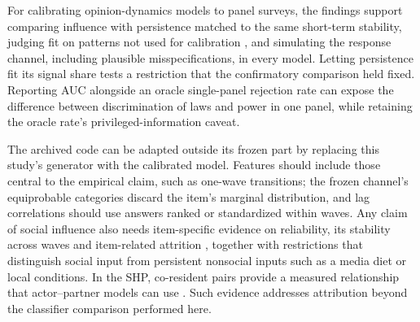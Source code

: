For calibrating opinion-dynamics models to panel surveys, the findings support comparing influence with persistence matched to the same short-term stability, judging fit on patterns not used for calibration \cite{grimm2005}, and simulating the response channel, including plausible misspecifications, in every model. Letting persistence fit its signal share tests a restriction that the confirmatory comparison held fixed. Reporting AUC alongside an oracle single-panel rejection rate can expose the difference between discrimination of laws and power in one panel, while retaining the oracle rate's privileged-information caveat.

The archived code can be adapted outside its frozen part by replacing this study's generator with the calibrated model. Features should include those central to the empirical claim, such as one-wave transitions; the frozen channel's equiprobable categories discard the item's marginal distribution, and lag correlations should use answers ranked or standardized within waves. Any claim of social influence also needs item-specific evidence on reliability, its stability across waves and item-related attrition \cite{lipps2007,voorpostel2010}, together with restrictions that distinguish social input from persistent nonsocial inputs such as a media diet or local conditions. In the SHP, co-resident pairs provide a measured relationship that actor--partner models can use \cite{voorpostel2025shp,kennykashy2006}. Such evidence addresses attribution beyond the classifier comparison performed here.
